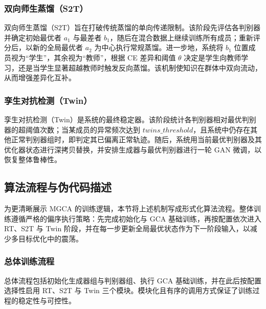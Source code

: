 \subsubsection{双向师生蒸馏（S2T）}
双向师生蒸馏（S2T）旨在打破传统蒸馏的单向传递限制。该阶段先评估各判别器并确定初始最优者 $a_1$ 与最差者 $b_1$，随后在混合数据上继续训练所有成员；重新评分后，以新的全局最优者 $a_2$ 为中心执行常规蒸馏。进一步地，系统将 $b_1$ 位置成员视为“学生”，其余视为“教师”，根据 CE 差异和阈值 $\theta$ 决定是学生向教师学习，还是当学生显著超越教师时触发反向蒸馏。该机制使知识在群体中双向流动，从而增强差异化互补。

\subsubsection{孪生对抗检测（Twin）}
孪生对抗检测（Twin）是系统的最终稳定器。该阶段统计各判别器相对最优判别器的超阈值次数；当某成员的异常频次达到 $twins\_threshold$，且系统中仍存在其他正常判别器组时，即判定其已偏离正常轨迹。随后，系统用当前最优判别器及其优化器状态进行深拷贝替换，并安排生成器与最优判别器进行一轮 GAN 微调，以恢复整体鲁棒性。

\subsection{算法流程与伪代码描述}
为更清晰展示 MGCA 的训练逻辑，本节将上述机制写成形式化算法流程。整体训练遵循严格的偏序执行策略：先完成初始化与 GCA 基础训练，再按配置依次进入 RT、S2T 与 Twin 阶段，并在每一步更新全局最优状态作为下一阶段输入，以减少多目标优化中的震荡。

\subsubsection{总体训练流程}
总体流程包括初始化生成器组与判别器组、执行 GCA 基础训练，并在此后按配置选择性启用 RT、S2T 与 Twin 三个模块。模块化且有序的调用方式保证了训练过程的稳定性与可控性。

